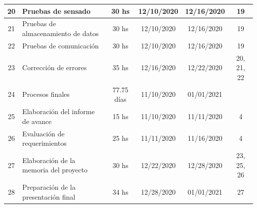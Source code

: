 \documentclass[11pt]{charter}
\begin{document}
\begin{table}[htpb]
\begin{tabularx}{\linewidth}{@{}|c|X|c|c|c|c|@{}}
20 & Pruebas de sensado &  30 hs & 12/10/2020 & 	12/16/2020 & 19\\ \hline
21 & Pruebas de almacenamiento de datos & 30 hs & 12/10/2020 & 	12/16/2020 &19\\ \hline
22 & Pruebas de comunicación & 30 hs & 12/10/2020 & 	12/16/2020 & 19\\ \hline
23 & Corrección de errores &  35 hs & 12/16/2020 & 	12/22/2020 &20, 21, 22\\ \hline
24 & Procesos finales &  77.75 días & 11/10/2020 & 	01/01/2021 & \\ \hline
25 & Elaboración del informe de avance &  15 hs & 11/10/2020 & 	11/11/2020 & 4\\ \hline
26 & Evaluación de requerimientos &  25 hs & 11/11/2020 & 	11/16/2020 & 4\\ \hline
27 & Elaboración de la memoria del proyecto &  30 hs & 12/22/2020 & 	12/28/2020 & 23, 25, 26\\ \hline
28 & Preparación de la presentación final &  34 hs &12/28/2020 & 	01/01/2021 &  27\\ 
\hline
\end{tabularx}%
\label{tab:gantt}
\end{table}
\end{document}
